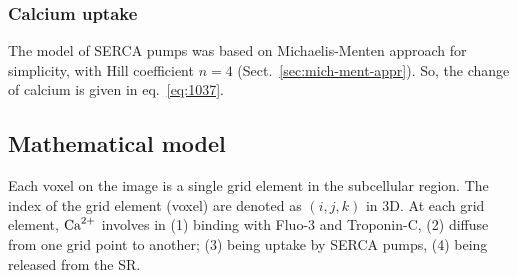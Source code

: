 \subsubsection{Calcium uptake}
\label{sec:calcium-uptake}

The model of SERCA pumps was based on Michaelis-Menten approach for
simplicity, with Hill coefficient $n=4$
(Sect.~\ref{sec:mich-ment-appr}). So, the change of calcium is given
in eq.~\eqref{eq:1037}.



\subsection{Mathematical model}
\label{sec:mathematical-model-18}

Each voxel on the image is a single grid element in the subcellular
region. The index of the grid element (voxel) are denoted as $(i,j,k)$
in 3D. At each grid element, ${\text{Ca}^{2+}}$ involves in (1) binding with Fluo-3
and Troponin-C, (2) diffuse from one grid point
to another; (3) being uptake by SERCA pumps, (4) being released from
the SR. %
